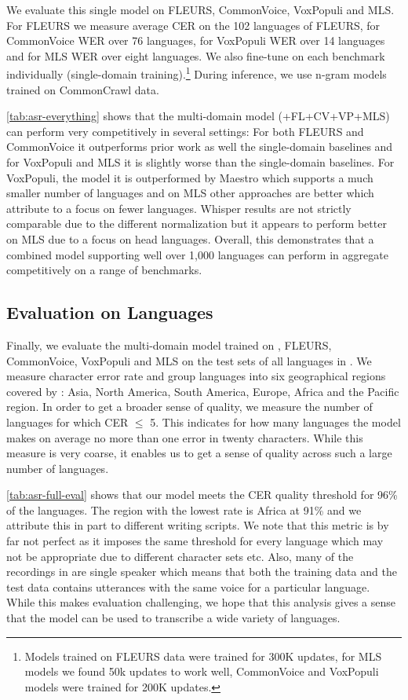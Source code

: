 We evaluate this single model on FLEURS, CommonVoice, VoxPopuli and MLS.
For FLEURS we measure average CER on the 102 languages of FLEURS, for CommonVoice WER over 76 languages, for VoxPopuli WER over 14 languages and for MLS WER over eight languages.
We also fine-tune  on each benchmark individually (single-domain training).\footnote{
Models trained on FLEURS data were trained for 300K updates, for MLS models we found 50k updates to work well, CommonVoice and VoxPopuli models were trained for 200K updates.
}
During inference, we use n-gram models trained on CommonCrawl data.

\autoref{tab:asr-everything} shows that the multi-domain model (\MMS{}+FL+CV+VP+MLS) can perform very competitively in several settings:
For both FLEURS and CommonVoice it outperforms prior work as well the single-domain baselines and for VoxPopuli and MLS it is slightly worse than the single-domain baselines.
For VoxPopuli, the \modelname{} model it is outperformed by Maestro which supports a much smaller number of languages and on MLS other approaches are better which attribute to a focus on fewer languages.
Whisper results are not strictly comparable due to the different normalization but it appears to perform better on MLS due to a focus on head languages.
Overall, this demonstrates that a combined model supporting well over 1,000 languages can perform in aggregate competitively on a range of benchmarks.



\subsection{Evaluation on \nummmslang{} Languages}
\label{sec:asr-full-eval}

\insertTableResultsASRFullEval

Finally, we evaluate the multi-domain model trained on \MMS{}, FLEURS, CommonVoice, VoxPopuli and MLS on the test sets of all \nummmslang{} languages in \MMS{}.
We measure character error rate and group languages into six geographical regions covered by \MMS{}: Asia,
North America, South America, Europe, Africa and the Pacific region.
In order to get a broader sense of quality, we measure the number of languages for which CER $\leq$ 5. 
This indicates for how many languages the model makes on average no more than one error in twenty characters.
While this measure is very coarse, it enables us to get a sense of quality across such a large number of languages.

\autoref{tab:asr-full-eval} shows that our model meets the CER quality threshold for 96\% of the \nummmslang{} languages.
The region with the lowest rate is Africa at 91\% and we attribute this in part to different writing scripts. 
We note that this metric is by far not perfect as it imposes the same threshold for every language which may not be appropriate due to different character sets etc.
Also, many of the recordings in \MMS{} are single speaker which means that both the training data and the test data contains utterances with the same voice for a particular language.
While this makes evaluation challenging, we hope that this analysis gives a sense that the model can be used to transcribe a wide variety of languages.